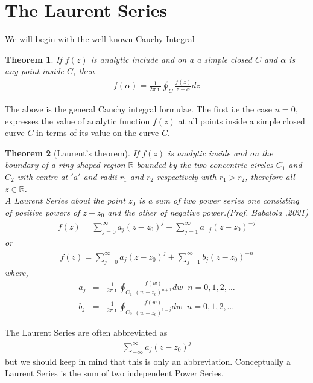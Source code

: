 \documentclass[11pt]{report}
\newcommand{\sps}{\\[0.2cm]}
\newcommand{\real}{ \mathbb{R}}
\newcommand{\imaginary}{\imath}
\newtheorem{theorem}{Theorem}[chapter]
\begin{document}
	\section{The Laurent Series}
	We will begin with the well known Cauchy Integral
	\begin{theorem}
		If $f(z)$ is analytic include and on a a simple closed $C$ and $\alpha$ is any point inside $C$, then
		\begin{eqnarray}
			f(\alpha) = \frac{1}{2\pi\imaginary}\oint_C\frac{f(z)}{z-\alpha}dz
		\end{eqnarray}
	\end{theorem}
	The above is the general Cauchy integral formulae. The first i.e the case $n=0$, expresses the value of analytic function $f(z)$ at all points inside a simple closed curve $C$ in terms of its value on the curve $C$.
	
	\begin{theorem}[Laurent's theorem]
		If $f(z)$ is analytic inside and on the boundary of a ring-shaped region $\real$ bounded by the two concentric circles $C_1$ and $C_2$ with centre at $'a'$ and radii $r_1$ and $r_2$ respectively with $r_1 > r_2$, therefore all $z\in\real$.\\
		A Laurent Series about the point $z_0$ is a sum of two power series one consisting of positive powers of $z-z_0$ and the other of negative power.(Prof. Babalola ,2021)
		\begin{eqnarray*}
			f(z) = \sum_{j=0}^{\infty}a_j(z-z_0)^j + \sum_{j=1}^{\infty}a_{-j}(z-z_0)^{-j}
		\end{eqnarray*}
		or
		\begin{eqnarray*}
			f(z) = \sum_{j=0}^{\infty}a_j(z-z_0)^j + \sum_{j=1}^{\infty}b_j(z-z_0)^{-n}
		\end{eqnarray*}
		where,
		\begin{eqnarray*}
			a_j &=& \frac{1}{2\pi\imaginary}\oint_{C_1}\frac{f(w)}{(w-z_0)^{n+1}}dw\;\; n=0,1,2,\ldots\sps
			b_j &=& \frac{1}{2\pi\imaginary}\oint_{C_2}\frac{f(w)}{(w-z_0)^{1-j}}dw\;\; n=0,1,2,\ldots
		\end{eqnarray*}
	\end{theorem}
	The Laurent Series are often abbreviated as 
	\begin{eqnarray}
		\sum_{-\infty}^{\infty} a_j(z-z_0)^j
	\end{eqnarray}
	but we should keep in mind that this is only an abbreviation. Conceptually a Laurent Series is the sum of two independent Power Series.\\
	
\end{document}
